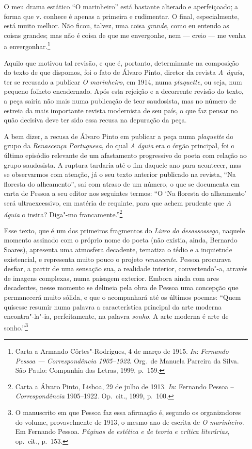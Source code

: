 \begin{hedraquote}
O meu drama estático “O marinheiro” está bastante alterado e
aperfeiçoado; a forma que v. conhece é apenas a primeira e
rudimentar.
O final, especialmente, está muito melhor.
Não ficou, talvez, uma coisa
\textit{grande}, como eu entendo as coisas grandes;
mas não é coisa de
que me envergonhe, nem --- creio --- me
venha a envergonhar.\footnote{
Carta a Armando Côrtes"-Rodrigues, 4 de março de 1915.
\textit{In}: \textit{Fernando Pessoa ---
Correspondência 1905--1922}. Org.~de Manuela Parreira
da Silva. São Paulo: Companhia das Letras, 1999, p.~159.}
\end{hedraquote}

Aquilo que motivou tal revisão, e que é, portanto, determinante na
composição do texto de que dispomos, foi o fato de Álvaro Pinto,
diretor da revista \mbox{\textit{A águia}}, ter se recusado a publicar
\textit{O marinheiro}, em 1914, numa \textit{plaquette},
ou seja, num
pequeno folheto encadernado. Após esta rejeição 
e a decorrente revisão
do texto, a peça sairia não mais numa publicação de teor
saudosista,
mas no número de estreia da mais importante
revista modernista de seu
país, o que faz pensar no quão decisiva deve 
ter sido essa recusa na depuração da peça. 

A bem dizer, a recusa de Álvaro Pinto em publicar a peça numa
\textit{plaquette} do grupo da \textit{Renascença}
\textit{Portuguesa},
do qual \textit{A águia} era o órgão principal, 
foi o último episódio
relevante de um afastamento progressivo do
poeta com relação ao grupo
saudosista. A ruptura tardaria até o 
fim daquele ano para acontecer,
mas se observarmos com atenção, já o seu
texto anterior publicado na
revista, “Na floresta do alheamento”, 
sai com atraso de um número, o
que se documenta em carta de Pessoa
a seu editor nos seguintes termos:
“O ‘Na floresta do alheamento’ será ultraexcessivo, em matéria de
requinte, para que achem prudente que \textit{A águia} o insira?
Diga"-mo francamente.”\footnote{ Carta a Álvaro Pinto,
Lisboa, 29 de julho de 1913. \textit{In}: Fernando Pessoa --
\textit{Correspondência}
1905--1922. Op.~cit., 1999, p.~100.} 

Esse texto, que é um dos primeiros fragmentos do \textit{Livro do
desassossego}, naquele momento assinado 
com o próprio nome do poeta
(não existia, ainda, Bernardo Soares), apresenta uma atmosfera
decadente, tematiza o tédio e a inquietude existencial,
e representa
muito pouco o projeto \textit{renascente}.
Pessoa procurava desfiar, a
partir de uma sensação sua, a realidade interior, convertendo"-a,
através de imagens complexas, numa paisagem exterior.
Embora ainda com
ares decadentes, nesse momento se delineia pela obra de Pessoa uma
concepção que permanecerá muito sólida, e que o acompanhará até os
últimos poemas: “Quem quisesse resumir numa palavra a
característica
principal da arte moderna encontra"-la"-ia, 
perfeitamente, na palavra
\textit{sonho}. A arte moderna é arte de 
sonho.”\footnote{ O manuscrito
em que Pessoa faz essa afirmação é, segundo
os organizadores do volume,
provavelmente de 1913, o mesmo ano de escrita 
de \textit{O marinheiro}. Em
Fernando Pessoa. \textit{Páginas
de estética e de teoria e crítica
literárias}, op.~cit., p.~153.} 

